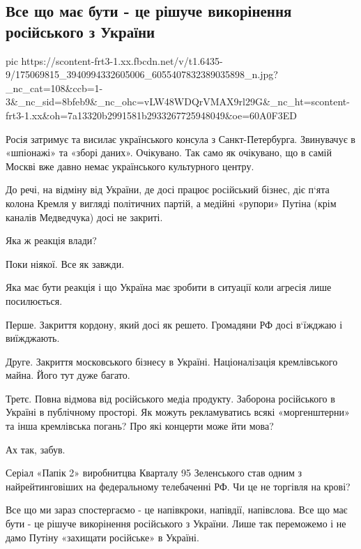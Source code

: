  
 
 
 
 
\subsection{Все що має бути - це рішуче викорінення російського з України}

\ifcmt
  pic https://scontent-frt3-1.xx.fbcdn.net/v/t1.6435-9/175069815_3940994332605006_6055407832389035898_n.jpg?_nc_cat=108&ccb=1-3&_nc_sid=8bfeb9&_nc_ohc=vLW48WDQrVMAX9rl29G&_nc_ht=scontent-frt3-1.xx&oh=7a13320b2991581b2933267725948049&oe=60A0F3ED
\fi

Росія затримує та висилає українського консула з Санкт-Петербурга. Звинувачує в
«шпіонажі» та «зборі даних». Очікувано. Так само як очікувано, що в самій
Москві вже давно немає українського культурного центру. 

До речі, на відміну від України, де досі працює російський бізнес, діє п‘ята
колона Кремля у вигляді політичних партій, а медійні «рупори» Путіна (крім
каналів Медведчука) досі не закриті.

Яка ж реакція влади? 

Поки ніякої. Все як завжди.

Яка має бути реакція і що Україна має зробити в ситуації коли агресія лише посилюється.

Перше. Закриття кордону, який досі як решето. Громадяни РФ досі в‘їжджаю і виїжджають. 

Друге. Закриття московського бізнесу в Україні. Націоналізація кремлівського майна. Його тут дуже багато.

Третє. Повна відмова від російського медіа продукту. Заборона російського в
Україні в публічному просторі. Як можуть рекламуватись всякі «моргенштерни» та
інша кремлівська погань? Про які концерти може йти мова? 

Ах так, забув. 

Серіал «Папік 2» виробнитцва Кварталу 95 Зеленського став одним з
найрейтинговіших на федеральному телебаченні РФ. Чи це не торгівля на крові? 

Все що ми зараз спостергаємо - це напівкроки, напівдії, напівслова. Все що має
бути - це рішуче викорінення російського з України. Лише так переможемо і не
дамо Путіну «захищати російське» в Україні.
